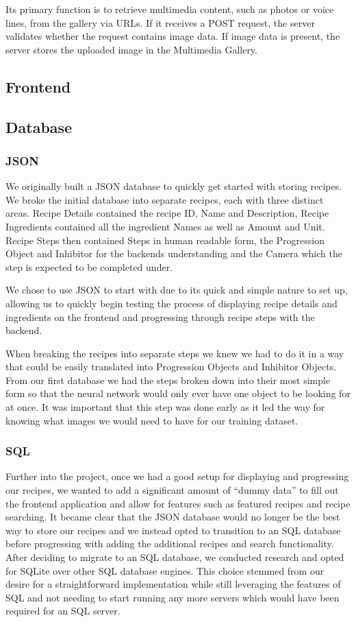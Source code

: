 \documentclass{article}
\begin{document}
Its primary function is to retrieve multimedia content, such as photos or voice
lines, from the gallery via URLs. If it receives a POST request, the server
validates whether the request contains image data. If image data is present,
the server stores the uploaded image in the Multimedia Gallery.

\subsection{Frontend}

\subsection{Database}
\subsubsection{JSON}
We originally built a JSON database to quickly get started with storing
recipes. We broke the initial database into separate recipes, each with three
distinct areas. Recipe Details contained the recipe ID, Name and Description,
Recipe Ingredients contained all the ingredient Names as well as Amount and
Unit. Recipe Steps then contained Steps in human readable form, the Progression
Object and Inhibitor for the backends understanding and the Camera which the
step is expected to be completed under.

We chose to use JSON to start with due to its quick and simple nature to set
up, allowing us to quickly begin testing the process of displaying recipe
details and ingredients on the frontend and progressing through recipe steps
with the backend.

When breaking the recipes into separate steps we knew we had to do it in a way
that could be easily translated into Progression Objects and Inhibitor Objects.
From our first database we had the steps broken down into their most simple
form so that the neural network would only ever have one object to be looking
for at once. It was important that this step was done early as it led the way
for knowing what images we would need to have for our training dataset.
\subsubsection{SQL}
Further into the project, once we had a good setup for displaying and
progressing our recipes, we wanted to add a significant amount of “dummy data”
to fill out the frontend application and allow for features such as featured
recipes and recipe searching. It became clear that the JSON database would no
longer be the best way to store our recipes and we instead opted to transition
to an SQL database before progressing with adding the additional recipes and
search functionality. After deciding to migrate to an SQL database, we
conducted research and opted for SQLite over other SQL database engines. This
choice stemmed from our desire for a straightforward implementation while still
leveraging the features of SQL and not needing to start running any more
servers which would have been required for an SQL server.
\end{document}
